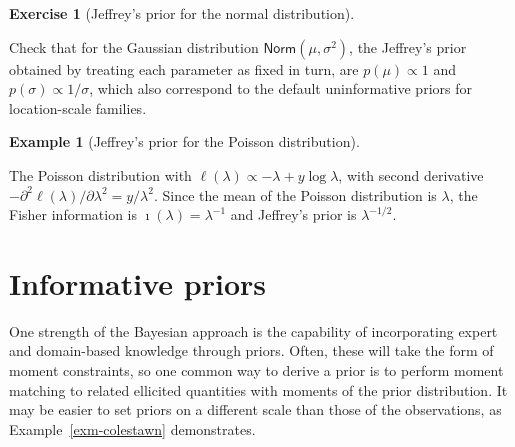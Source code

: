 \documentclass[
  11pt,
  letterpaper,
]{scrbook}
\theoremstyle{definition}
\newtheorem{example}{Example}[chapter]
\theoremstyle{definition}
\theoremstyle{definition}
\newtheorem{exercise}{Exercise}[chapter]
\theoremstyle{plain}
\theoremstyle{remark}
\begin{document}
\begin{exercise}[Jeffrey's prior for the normal
distribution]\protect\hypertarget{exr-jeffreysnormal}{}\label{exr-jeffreysnormal}

Check that for the Gaussian distribution
\(\mathsf{Norm}(\mu, \sigma^2)\), the Jeffrey's prior obtained by
treating each parameter as fixed in turn, are \(p(\mu) \propto 1\) and
\(p(\sigma) \propto 1/\sigma\), which also correspond to the default
uninformative priors for location-scale families.

\end{exercise}

\begin{example}[Jeffrey's prior for the Poisson
distribution]\protect\hypertarget{exm-jeffreyspoisson}{}\label{exm-jeffreyspoisson}

The Poisson distribution with
\(\ell(\lambda) \propto -\lambda + y\log \lambda\), with second
derivative
\(-\partial^2 \ell(\lambda)/\partial \lambda^2 = y/\lambda^2\). Since
the mean of the Poisson distribution is \(\lambda\), the Fisher
information is \(\imath(\lambda) = \lambda^{-1}\) and Jeffrey's prior is
\(\lambda^{-1/2}\).

\end{example}

\hypertarget{informative-priors}{%
\section{Informative priors}\label{informative-priors}}

One strength of the Bayesian approach is the capability of incorporating
expert and domain-based knowledge through priors. Often, these will take
the form of moment constraints, so one common way to derive a prior is
to perform moment matching to related ellicited quantities with moments
of the prior distribution. It may be easier to set priors on a different
scale than those of the observations, as Example~\ref{exm-colestawn}
demonstrates.
\end{document}
